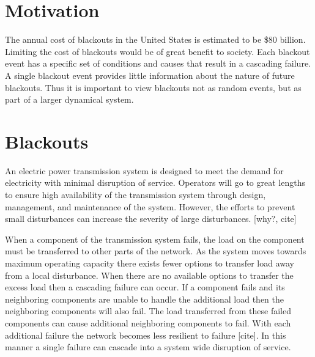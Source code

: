 \chapter{Motivation}
The annual cost of blackouts in the United States is estimated to be \$80 billion.\cite{lacommare2004understanding} Limiting the cost of blackouts would be of great benefit to society. Each blackout event has a specific set of conditions and causes that result in a cascading failure. A single blackout event provides little information about the nature of future blackouts. Thus it is important to view blackouts not as random events, but as part of a larger dynamical system.\cite{carreras2004complex} 

\chapter{Blackouts}
An electric power transmission system is designed to meet the demand for electricity with minimal disruption of service. Operators will go to great lengths to ensure high availability of the transmission system through design, management, and maintenance of the system. \cite{carreras2001evidence} However, the efforts to prevent small disturbances can increase the severity of large disturbances. [why?, cite]

When a component of the transmission system fails, the load on the component must be transferred to other parts of the network. As the system moves towards maximum operating capacity there exists fewer options to transfer load away from a local disturbance. When there are no available options to transfer the excess load then a cascading failure can occur. If a component fails and its neighboring components are unable to handle the additional load then the neighboring components will also fail. The load transferred from these failed components can cause additional neighboring components to fail. With each additional failure the network becomes less resilient to failure [cite]. In this manner a single failure can cascade into a system wide disruption of service. 


